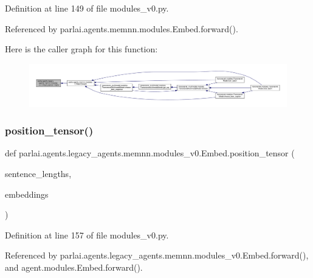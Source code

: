 Definition at line 149 of file modules\+\_\+v0.\+py.



Referenced by parlai.\+agents.\+memnn.\+modules.\+Embed.\+forward().

Here is the caller graph for this function\+:
\nopagebreak
\begin{figure}[H]
\begin{center}
\leavevmode
\includegraphics[width=350pt]{classparlai_1_1agents_1_1legacy__agents_1_1memnn_1_1modules__v0_1_1Embed_aac0da7cbc9d64949060c6c681172220f_icgraph}
\end{center}
\end{figure}
\mbox{\label{classparlai_1_1agents_1_1legacy__agents_1_1memnn_1_1modules__v0_1_1Embed_a40a4aebba88622f6734725da0a1fd12d}} 
\subsubsection{\texorpdfstring{position\+\_\+tensor()}{position\_tensor()}}
{\footnotesize\ttfamily def parlai.\+agents.\+legacy\+\_\+agents.\+memnn.\+modules\+\_\+v0.\+Embed.\+position\+\_\+tensor (\begin{DoxyParamCaption}\item[{}]{sentence\+\_\+lengths,  }\item[{}]{embeddings }\end{DoxyParamCaption})\hspace{0.3cm}{\ttfamily [static]}}



Definition at line 157 of file modules\+\_\+v0.\+py.



Referenced by parlai.\+agents.\+legacy\+\_\+agents.\+memnn.\+modules\+\_\+v0.\+Embed.\+forward(), and agent.\+modules.\+Embed.\+forward().

